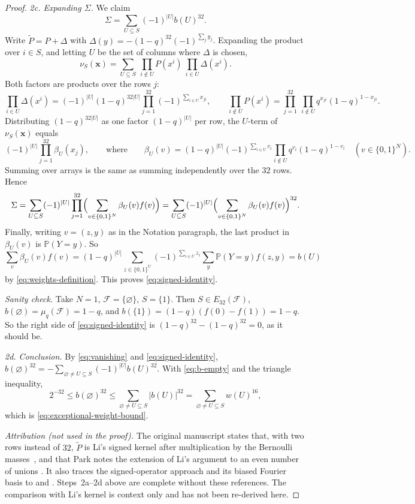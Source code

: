 \documentclass[11pt,letterpaper]{article}
\theoremstyle{definition}
\theoremstyle{remark}
\numberwithin{equation}{section}
\begin{document}
\begin{proof}
\emph{2c. Expanding $\Sigma$.} We claim
\begin{equation}\label{eq:signed-identity}
 \Sigma=\sum_{U\subseteq S}(-1)^{|U|}b(U)^{32}.
\end{equation}
Write $\widetilde P=P+\Delta$ with
$\Delta(y)=-(1-q)^{32}(-1)^{\sum_jy_j}$. Expanding the product over
$i\in S$, and letting $U$ be the set of columns where $\Delta$ is chosen,
\[
\nu_S(\mathbf x)=\sum_{U\subseteq S}\ \prod_{i\notin U}P(x^i)\ \prod_{i\in U}\Delta(x^i).
\]
Both factors are products over the rows $j$:
\[
\prod_{i\in U}\Delta(x^i)
=(-1)^{|U|}(1-q)^{32|U|}\prod_{j=1}^{32}(-1)^{\sum_{i\in U}x_{ji}},
\qquad
\prod_{i\notin U}P(x^i)
=\prod_{j=1}^{32}\ \prod_{i\notin U}q^{x_{ji}}(1-q)^{1-x_{ji}} .
\]
Distributing $(1-q)^{32|U|}$ as one factor $(1-q)^{|U|}$ per row, the
$U$-term of $\nu_S(\mathbf x)$ equals
\[
(-1)^{|U|}\prod_{j=1}^{32}\beta_U(x_j),
\qquad\text{where}\qquad
\beta_U(v)=(1-q)^{|U|}(-1)^{\sum_{i\in U}v_i}
\prod_{i\notin U}q^{v_i}(1-q)^{1-v_i}\quad(v\in\{0,1\}^N).
\]
Summing over arrays is the same as summing independently over the $32$
rows. Hence
\[
\Sigma=\sum_{U\subseteq S}(-1)^{|U|}\prod_{j=1}^{32}
\Bigl(\sum_{v\in\{0,1\}^N}\beta_U(v)f(v)\Bigr)
=\sum_{U\subseteq S}(-1)^{|U|}
\Bigl(\sum_{v\in\{0,1\}^N}\beta_U(v)f(v)\Bigr)^{32}.
\]
Finally, writing $v=(z,y)$ as in the Notation paragraph, the last product
in $\beta_U(v)$ is $\mathbb P(Y=y)$. So
\[
\sum_{v}\beta_U(v)f(v)
=(1-q)^{|U|}\sum_{z\in\{0,1\}^U}(-1)^{\sum_{i\in U}z_i}
\sum_{y}\mathbb P(Y=y)f(z,y)=b(U)
\]
by \eqref{eq:weights-definition}. This proves \eqref{eq:signed-identity}.

\emph{Sanity check.} Take $N=1$, $\mathcal F=\{\varnothing\}$,
$S=\{1\}$. Then $S\in E_{32}(\mathcal F)$,
$b(\varnothing)=\mu_q(\mathcal F)=1-q$, and
$b(\{1\})=(1-q)(f(0)-f(1))=1-q$. So the right side of
\eqref{eq:signed-identity} is $(1-q)^{32}-(1-q)^{32}=0$, as it should be.

\emph{2d. Conclusion.} By \eqref{eq:vanishing} and
\eqref{eq:signed-identity},
$b(\varnothing)^{32}=-\sum_{\varnothing\ne U\subseteq S}(-1)^{|U|}b(U)^{32}$.
With \eqref{eq:b-empty} and the triangle inequality,
\[
 2^{-32}\le b(\varnothing)^{32}
 \le\sum_{\varnothing\ne U\subseteq S}|b(U)|^{32}
 =\sum_{\varnothing\ne U\subseteq S}w(U)^{16},
\]
which is \eqref{eq:exceptional-weight-bound}.

\emph{Attribution (not used in the proof).} The original manuscript
states that, with two rows instead of $32$, $\widetilde P$ is Li's signed
kernel after multiplication by the Bernoulli
masses~\cite[Section~2]{Li26}, and that Park notes the extension of Li's
argument to an even number of unions
\cite[Corollary~3.5, footnote~3]{Park26}. It also traces the
signed-operator approach and its biased Fourier basis to
\cite[Section~2.2]{Friedgut08} and
\cite[Sections~2.2 and~4.1]{EllisFilmusFriedgut12}. Steps~2a--2d above are
complete without these references. The comparison with Li's kernel is
context only and has not been re-derived here.


\end{proof}
\end{document}
